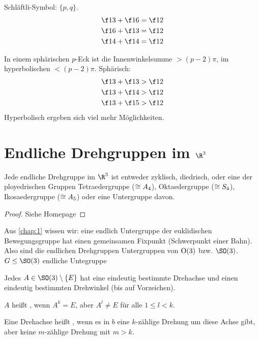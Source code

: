 Schläftli-Symbol: $\{p, q\}$.
\begin{align*}
	\f 13 + \f 16 &= \f 12 \\
	\f 16 + \f 13 &= \f 12 \\
	\f 14 + \f 14 &= \f 12
\end{align*}

In einem sphärischen $p$-Eck ist die Innenwinkelsumme $> (p-2) \pi$, im hyperbolischen $< (p-2)\pi$.
Sphärisch:
\begin{align*}
	\f 13 + \f 13 &> \f 12 \\
	\f 13 + \f 14 &> \f 12 \\
	\f 13 + \f 15 &> \f 12
\end{align*}
Hyperbolisch ergeben sich viel mehr Möglichkeiten.


\section{Endliche Drehgruppen im \texorpdfstring{$\R^3$}{ℝ³}}


\begin{st}
	Jede endliche Drehgruppe im $\R^3$ ist entweder zyklisch, diedrisch, oder eine der ployedrischen Gruppen Tetraedergruppe ($\cong A_4$), Oktaedergruppe ($\cong S_4$), Ikosaedergruppe ($\cong A_5$) oder eine Untergruppe davon.
	\begin{proof}
		Siehe Homepage
	\end{proof}
\end{st}

\begin{nt}
	Aus \ref{chap:1} wissen wir: eine endlich Untergruppe der euklidischen Bewegungsgruppe hat einen gemeinsamen Fixpunkt (Schwerpunkt einer Bahn).
	Also sind die endlichen Drehgruppen Untergruppen von $\operatorname{O}(3)$ bzw. $\SO(3)$.
	$G \le \SO(3)$ endliche Untegruppe

	Jedes $A \in \SO(3) \setminus \{E\}$ hat eine eindeutig bestimmte Drehachse und einen eindeutig bestimmten Drehwinkel (bis auf Vorzeichen).
\end{nt}

\begin{df}
	$A$ heißt , wenn $A^k = E$, aber $A^l \neq E$ für alle $1 \le l < k$.

	Eine Drehachse heißt , wenn es in $b$ eine $k$-zählige Drehung um diese Achse gibt, aber keine $m$-zählige Drehung mit $m > k$.
\end{df}


